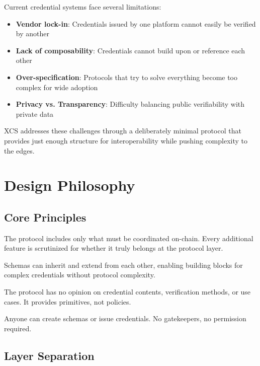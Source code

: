 \documentclass[11pt,a4paper]{article}
\begin{document}
Current credential systems face several limitations:

\begin{itemize}
    \item \textbf{Vendor lock-in}: Credentials issued by one platform cannot easily be verified by another
    \item \textbf{Lack of composability}: Credentials cannot build upon or reference each other
    \item \textbf{Over-specification}: Protocols that try to solve everything become too complex for wide adoption
    \item \textbf{Privacy vs. Transparency}: Difficulty balancing public verifiability with private data
\end{itemize}

XCS addresses these challenges through a deliberately minimal protocol that provides just enough structure for interoperability while pushing complexity to the edges.

\section{Design Philosophy}

\subsection{Core Principles}

\begin{description}[leftmargin=!,labelwidth=\widthof{\bfseries Composability:}]
    \item[Minimalism:] The protocol includes only what must be coordinated on-chain. Every additional feature is scrutinized for whether it truly belongs at the protocol layer.
    
    \item[Composability:] Schemas can inherit and extend from each other, enabling building blocks for complex credentials without protocol complexity.
    
    \item[Neutrality:] The protocol has no opinion on credential contents, verification methods, or use cases. It provides primitives, not policies.
    
    \item[Openness:] Anyone can create schemas or issue credentials. No gatekeepers, no permission required.
\end{description}

\subsection{Layer Separation}
\end{document}
